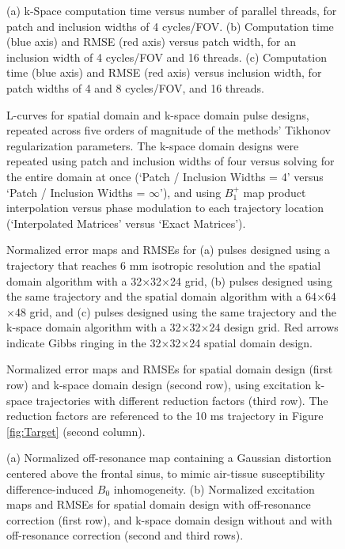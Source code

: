\documentclass[11pt]{article}
\begin{document}
\begin{figure}[!h]
	\centering
	\caption{(a) k-Space computation time versus number of parallel threads, for patch and inclusion widths of 4 cycles/FOV. 
	(b) Computation time (blue axis) and RMSE (red axis) versus patch width, for an inclusion width of 4 cycles/FOV and 16 threads. 
	(c) Computation time (blue axis) and RMSE (red axis) versus inclusion width, for patch widths of 4 and 8 cycles/FOV, and 16 threads.}
	\label{fig:ComputationTime}
\end{figure}

\begin{figure}[!h]
	\centering
	\caption{L-curves for spatial domain and k-space domain pulse designs, 
	repeated across five orders of magnitude of the methods' Tikhonov regularization parameters.
	The k-space domain designs were repeated using patch and inclusion widths of four versus solving for the entire domain at once (`Patch / Inclusion Widths = 4' versus `Patch / Inclusion Widths = $\infty$'),
	and using $B_1^+$ map product interpolation versus phase modulation to each trajectory location (`Interpolated Matrices' versus
	`Exact Matrices').}
	\label{fig:LCurves}
\end{figure}


\begin{figure}[!h]
	\centering
	\caption{Normalized error maps and RMSEs for 
	(a) pulses designed using a trajectory that reaches 6 mm isotropic resolution
	and the spatial domain algorithm with a 32$\times$32$\times$24 grid, 
	(b) pulses designed using the same trajectory and the spatial domain algorithm with a 64$\times$64$\times$48 grid,  
	and (c) pulses designed using the same trajectory and the k-space domain algorithm with a 32$\times$32$\times$24 design grid. 
	Red arrows indicate Gibbs ringing in the 32$\times$32$\times$24 spatial domain design.}
	\label{fig:GibbsRing}
\end{figure}


\begin{figure}[!h]
	\centering
	\caption{Normalized error maps and RMSEs for spatial domain design (first row) and k-space domain design (second row), 
	using excitation k-space trajectories with different reduction factors (third row).
	The reduction factors are referenced to the 10 ms trajectory in Figure \ref{fig:Target} (second column).}
	\label{fig:kspace_PTX_Acceleration}
\end{figure}


\begin{figure}[!h]
	\centering
	\caption{
	(a) Normalized off-resonance map containing a Gaussian distortion centered above the frontal sinus, 
	to mimic air-tissue susceptibility difference-induced $B_0$ inhomogeneity.
	(b) Normalized excitation maps and RMSEs for spatial domain design with off-resonance correction (first row), 
	and k-space domain design without and with off-resonance correction (second and third rows).}
	\label{fig:kspace_PTX_B0}
\end{figure}
\end{document}
